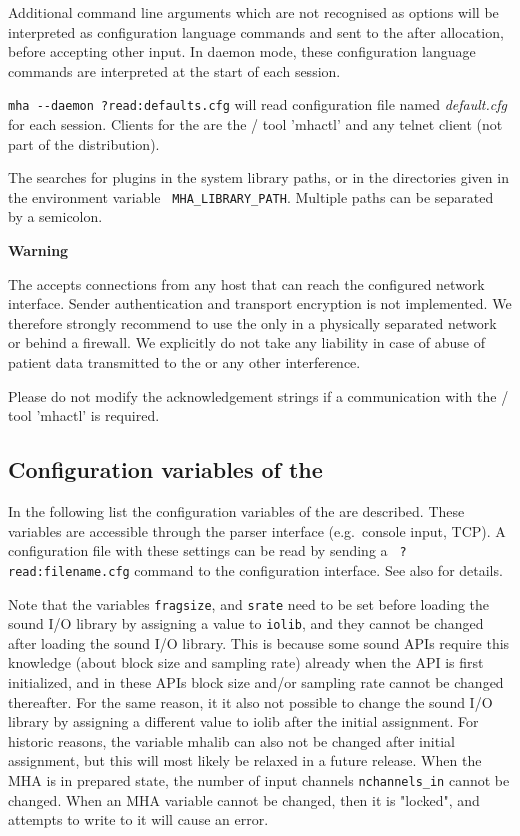 Additional command line arguments which are not recognised as options
will be interpreted as \mha{} configuration language commands and sent to the
\mhad{} after allocation, before accepting other input.
%
In daemon mode, these \mha{} configuration language commands are interpreted at the 
start of each session.

\verb!mha --daemon ?read:defaults.cfg! will read
configuration file named \emph{default.cfg} for each session.
%
Clients for the \mhad{} are the \Octave{}/\Matlab{} tool 'mhactl' and any
telnet client (not part of the distribution).

The \mhad{} searches for \mha{} plugins in the system library paths, or in
the directories given in the environment variable {\tt
MHA\_LIBRARY\_PATH}.
%
Multiple paths can be separated by a semicolon.

\textbf{Warning}

The \mhad{} accepts connections from any host that can reach
the configured network interface.
%
Sender authentication and transport encryption is not implemented.
%
We therefore strongly recommend to use the \mhad{} only in a
physically separated network or behind a firewall.
%
We explicitly do not take any liability in case of abuse of patient
data transmitted to the \mhad{} or any other interference.

Please do not modify the acknowledgement strings if a communication
with the \Octave{}/\Matlab{} tool 'mhactl' is required.

\subsection{Configuration variables of the \mhad{}}

In the following list the configuration variables of the \mhad{} are
described. These variables are accessible through the parser interface
(e.g.\ console input, TCP).
%
A configuration file with these settings can be read by sending a {\tt
?read:filename.cfg} command to the configuration interface. See also
 for details.

Note that the variables \texttt{fragsize}, and \texttt{srate} need to
be set before loading the sound I/O library by assigning a value to
\texttt{iolib}, and they cannot be changed after loading the sound I/O
library. This is because some sound APIs require this knowledge (about
block size and sampling rate) already when the API is first
initialized, and in these APIs block size and/or sampling rate cannot
be changed thereafter.
%
For the same reason, it it also not possible to change the sound I/O
library by assigning a different value to iolib after the initial
assignment.
%
For historic reasons, the variable mhalib can also not be changed
after initial assignment, but this will most likely be relaxed in a
future release.
%
When the MHA is in prepared state, the number of input channels
\texttt{nchannels\_in} cannot be changed.
%
When an MHA variable cannot be changed, then it is "locked", and
attempts to write to it will cause an error.

